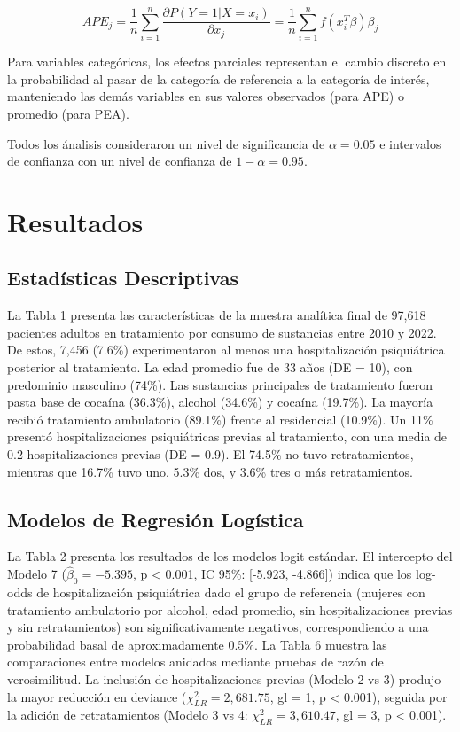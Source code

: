 \documentclass[
  spanish,
  10pt,
]{article}
\begin{document}
\[APE_j = \frac{1}{n}\sum_{i=1}^{n} \frac{\partial P(Y=1|X=x_i)}{\partial x_j} = \frac{1}{n}\sum_{i=1}^{n} f(x_i^T\beta)\beta_j\]

Para variables categóricas, los efectos parciales representan el cambio
discreto en la probabilidad al pasar de la categoría de referencia a la
categoría de interés, manteniendo las demás variables en sus valores
observados (para APE) o promedio (para PEA).

Todos los ánalisis consideraron un nivel de significancia de
\(\alpha=0.05\) e intervalos de confianza con un nivel de confianza de
\(1-\alpha=0.95\).

\newpage

\section{Resultados}\label{resultados}

\subsection{Estadísticas
Descriptivas}\label{estaduxedsticas-descriptivas}

La Tabla 1 presenta las características de la muestra analítica final de
97,618 pacientes adultos en tratamiento por consumo de sustancias entre
2010 y 2022. De estos, 7,456 (7.6\%) experimentaron al menos una
hospitalización psiquiátrica posterior al tratamiento. La edad promedio
fue de 33 años (DE = 10), con predominio masculino (74\%). Las
sustancias principales de tratamiento fueron pasta base de cocaína
(36.3\%), alcohol (34.6\%) y cocaína (19.7\%). La mayoría recibió
tratamiento ambulatorio (89.1\%) frente al residencial (10.9\%). Un 11\%
presentó hospitalizaciones psiquiátricas previas al tratamiento, con una
media de 0.2 hospitalizaciones previas (DE = 0.9). El 74.5\% no tuvo
retratamientos, mientras que 16.7\% tuvo uno, 5.3\% dos, y 3.6\% tres o
más retratamientos.

\subsection{Modelos de Regresión
Logística}\label{modelos-de-regresiuxf3n-loguxedstica}

La Tabla 2 presenta los resultados de los modelos logit estándar. El
intercepto del Modelo 7 (\(\hat{\beta}_0 = -5.395\), p \textless{}
0.001, IC 95\%: {[}-5.923, -4.866{]}) indica que los log-odds de
hospitalización psiquiátrica dado el grupo de referencia (mujeres con
tratamiento ambulatorio por alcohol, edad promedio, sin
hospitalizaciones previas y sin retratamientos) son significativamente
negativos, correspondiendo a una probabilidad basal de aproximadamente
0.5\%. La Tabla 6 muestra las comparaciones entre modelos anidados
mediante pruebas de razón de verosimilitud. La inclusión de
hospitalizaciones previas (Modelo 2 vs 3) produjo la mayor reducción en
deviance (\(\chi^2_{LR} = 2,681.75\), gl = 1, p \textless{} 0.001),
seguida por la adición de retratamientos (Modelo 3 vs 4:
\(\chi^2_{LR} = 3,610.47\), gl = 3, p \textless{} 0.001).
\end{document}
